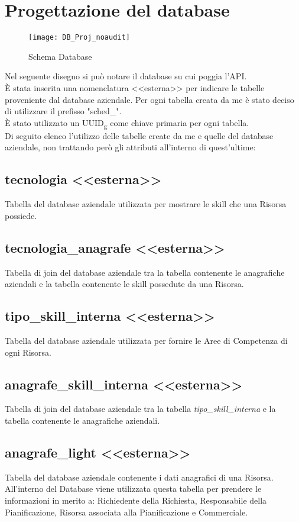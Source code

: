 \section{Progettazione del database}
\begin{figure}[H] 
    \centering 
    \texttt{[image: DB\_Proj\_noaudit]} 
    \caption{Schema Database}
\end{figure}
\noindent Nel seguente disegno si può notare il database su cui poggia l'API.\\
È stata inserita una nomenclatura <<esterna>> per indicare le tabelle proveniente dal database aziendale. Per ogni tabella creata da me è stato deciso di utilizzare il prefisso "sched\_".\\
È stato utilizzato un UUID\textsubscript{g} come chiave primaria per ogni tabella.\\
Di seguito elenco l'utilizzo delle tabelle create da me e quelle del database aziendale, non trattando però gli attributi all'interno di quest'ultime:

\subsection*{tecnologia <<esterna>>}
Tabella del database aziendale utilizzata per mostrare le skill che una Risorsa possiede.
\subsection*{tecnologia\_anagrafe <<esterna>>}
Tabella di join del database aziendale tra la tabella contenente le anagrafiche aziendali e la tabella contenente le skill possedute da una Risorsa.
\subsection*{tipo\_skill\_interna <<esterna>>}
Tabella del database aziendale utilizzata per fornire le Aree di Competenza di ogni Risorsa.
\subsection*{anagrafe\_skill\_interna <<esterna>>}
Tabella di join del database aziendale tra la tabella \textit{tipo\_skill\_interna} e la tabella contenente le anagrafiche aziendali.
\subsection*{anagrafe\_light <<esterna>>} 
Tabella del database aziendale contenente i dati anagrafici di una Risorsa. All'interno del Database viene utilizzata questa tabella per prendere le informazioni in merito a: Richiedente della Richiesta, Responsabile della Pianificazione, Risorsa associata alla Pianificazione e Commerciale.
